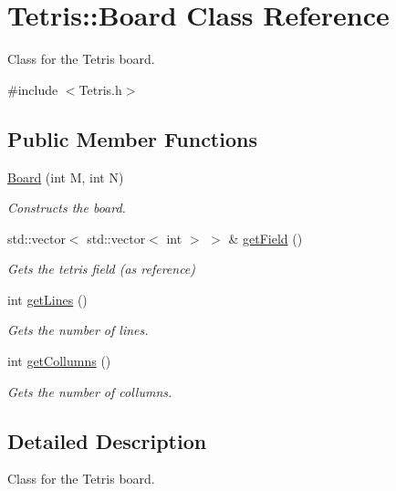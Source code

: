 \hypertarget{classTetris_1_1Board}{}\section{Tetris\+:\+:Board Class Reference}
\label{classTetris_1_1Board}


Class for the Tetris board.  




{\ttfamily \#include $<$Tetris.\+h$>$}

\subsection*{Public Member Functions}
\begin{DoxyCompactItemize}
\item 
\mbox{\hyperlink{classTetris_1_1Board_a8506030098461969d7c049785350622d}{Board}} (int M, int N)
\begin{DoxyCompactList}\small\item\em Constructs the board. \end{DoxyCompactList}\item 
std\+::vector$<$ std\+::vector$<$ int $>$ $>$ \& \mbox{\hyperlink{classTetris_1_1Board_ab282516ec2ee361b956ccc68a6e661df}{get\+Field}} ()
\begin{DoxyCompactList}\small\item\em Gets the tetris field (as reference) \end{DoxyCompactList}\item 
int \mbox{\hyperlink{classTetris_1_1Board_a53a614c61a25dfb508ccb45f235bb3b5}{get\+Lines}} ()
\begin{DoxyCompactList}\small\item\em Gets the number of lines. \end{DoxyCompactList}\item 
int \mbox{\hyperlink{classTetris_1_1Board_abff7a1233d19e4044b7d4ff35a347087}{get\+Collumns}} ()
\begin{DoxyCompactList}\small\item\em Gets the number of collumns. \end{DoxyCompactList}\end{DoxyCompactItemize}


\subsection{Detailed Description}
Class for the Tetris board. 

